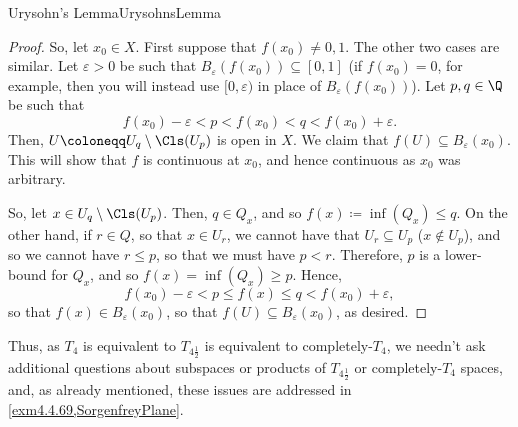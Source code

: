 \begin{thm}{Urysohn's Lemma}{UrysohnsLemma}
\begin{proof}
So, let $x_0\in X$.  First suppose that $f(x_0)\neq 0,1$.  The other two cases are similar.  Let $\varepsilon >0$ be such that $B_\varepsilon (f(x_0))\subseteq [0,1]$ (if $f(x_0)=0$, for example, then you will instead use $[0,\varepsilon )$ in place of $B_\varepsilon (f(x_0))$).  Let $p,q\in \Q$ be such that
\begin{equation}
f(x_0)-\varepsilon <p<f(x_0)<q<f(x_0)+\varepsilon .
\end{equation}
Then, $U\coloneqq U_q\setminus \Cls (U_p)$ is open in $X$.  We claim that $f(U)\subseteq B_\varepsilon (x_0)$.  This will show that $f$ is continuous at $x_0$, and hence continuous as $x_0$ was arbitrary.

So, let $x\in U_q\setminus \Cls (U_p)$.  Then, $q\in Q_x$, and so $f(x)\coloneqq \inf (Q_x)\leq q$.  On the other hand, if $r\in Q$, so that $x\in U_r$, we cannot have that $U_r\subseteq U_p$ ($x\notin U_p$), and so we cannot have $r\leq p$, so that we must have $p<r$.  Therefore, $p$ is a lower-bound for $Q_x$, and so $f(x)=\inf (Q_x)\geq p$.  Hence,
\begin{equation}
f(x_0)-\varepsilon <p\leq f(x)\leq q<f(x_0)+\varepsilon ,
\end{equation}
so that $f(x)\in B_{\varepsilon}(x_0)$, so that $f(U)\subseteq B_{\varepsilon}(x_0)$, as desired.
\end{proof}
\end{thm}
Thus, as $T_4$ is equivalent to $T_{4\frac{1}{2}}$ is equivalent to completely-$T_4$, we needn't ask additional questions about subspaces or products of $T_{4\frac{1}{2}}$ or completely-$T_4$ spaces, and, as already mentioned, these issues are addressed in \cref{exm4.4.69,SorgenfreyPlane}.

